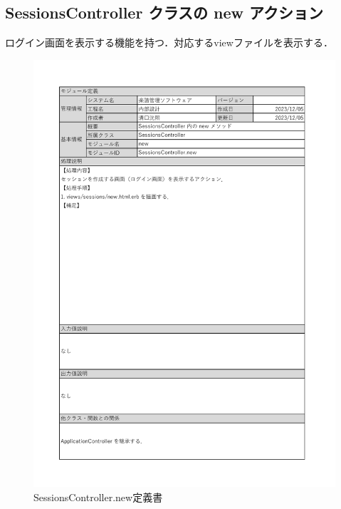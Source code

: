 \subsection*{SessionsController クラスの new アクション}
ログイン画面を表示する機能を持つ．対応するviewファイルを表示する．
\begin{figure}[H]
	\centering
	\includegraphics[scale=0.6]{img/Sessions/xlsx/SessionsController.new.pdf}
	\vspace{-1cm}
	\caption{SessionsController.new定義書}
\end{figure}
